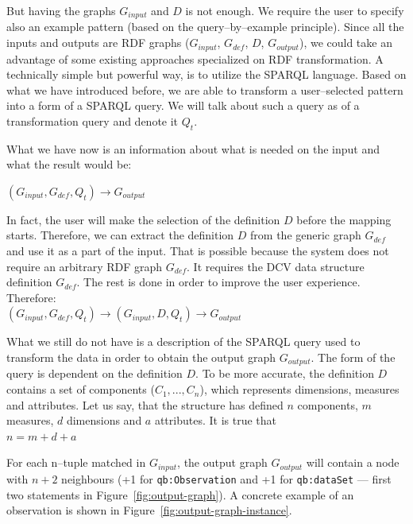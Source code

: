 But having the graphs $G_{input}$ and $D$ 
is not enough. We require the user to specify also an example pattern (based on the
query--by--example principle). Since all the inputs and outputs are RDF
graphs ($G_{input}$, $G_{def}$, $D$, $G_{output}$), we could take 
an advantage of some existing approaches specialized on RDF transformation. 
A technically simple but powerful way, is to utilize the SPARQL language. Based on what we have introduced before, we are able to transform a user--selected pattern into a form of a SPARQL
query. We will talk about such a query as of a transformation query and denote it $Q_t$.

What we have now is an information about what is needed on the input and 
what the result would be:

{\centering $(G_{input}, G_{def}, Q_t) \rightarrow G_{output}$ \\[0.5cm]}

In fact, the user will make the selection of the definition $D$ before the 
mapping starts. Therefore, we can extract the definition $D$ from the 
generic graph $G_{def}$ and use it as a part of the input. That is possible because 
the system does not require an arbitrary RDF graph $G_{def}$. It requires the DCV 
data structure definition $G_{def}$. The rest is done in order to improve the user 
experience. Therefore:\\

{\centering $(G_{input}, G_{def}, Q_t) \rightarrow (G_{input}, D, Q_t) \rightarrow G_{output}$  \\[0.5cm]}

What we still do not have is a description of the SPARQL query used to transform the 
data in order to obtain the output graph $G_{output}$. The form of the query is dependent on the 
definition $D$. To be more accurate, the definition $D$ contains
a set of components ($C_1, ... , C_n$), which represents dimensions, measures and attributes. Let us say, that the 
structure has defined $n$ components, $m$ measures, $d$ dimensions and $a$ 
attributes. It is true that\\

{\centering $n = m+d+a$ \\[0.5cm]}

For each n--tuple matched in $G_{input}$, the output graph $G_{output}$ will contain a node with $n+2$ 
neighbours (+1 for \verb|qb:Observation| and +1 for \verb|qb:dataSet| --- first two statements
in Figure~\ref{fig:output-graph}). A concrete example of an observation is shown 
in Figure~\ref{fig:output-graph-instance}.

